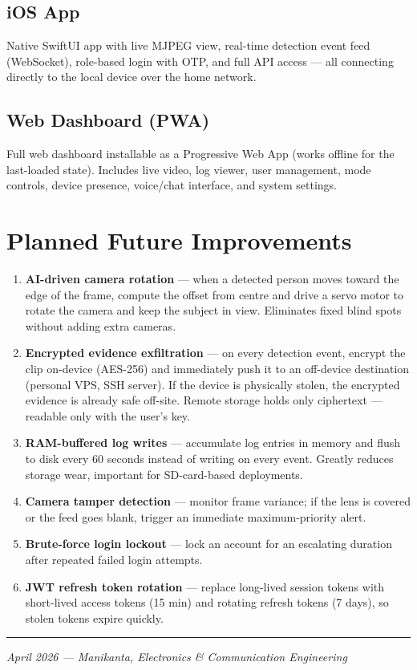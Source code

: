 \documentclass[12pt,a4paper]{article}
\begin{document}
\subsection*{iOS App}
Native SwiftUI app with live MJPEG view, real-time detection event feed
(WebSocket), role-based login with OTP, and full API access — all
connecting directly to the local device over the home network.

\subsection*{Web Dashboard (PWA)}
Full web dashboard installable as a Progressive Web App (works offline
for the last-loaded state). Includes live video, log viewer, user
management, mode controls, device presence, voice/chat interface, and
system settings.

\section*{Planned Future Improvements}

\begin{enumerate}[leftmargin=2em, itemsep=4pt]
  \item \textbf{AI-driven camera rotation} — when a detected person moves
        toward the edge of the frame, compute the offset from centre and
        drive a servo motor to rotate the camera and keep the subject in view.
        Eliminates fixed blind spots without adding extra cameras.

  \item \textbf{Encrypted evidence exfiltration} — on every detection event,
        encrypt the clip on-device (AES-256) and immediately push it to an
        off-device destination (personal VPS, SSH server). If the device
        is physically stolen, the encrypted evidence is already safe
        off-site. Remote storage holds only ciphertext — readable only with
        the user's key.

  \item \textbf{RAM-buffered log writes} — accumulate log entries in memory
        and flush to disk every 60 seconds instead of writing on every event.
        Greatly reduces storage wear, important for SD-card-based deployments.

  \item \textbf{Camera tamper detection} — monitor frame variance; if the
        lens is covered or the feed goes blank, trigger an immediate
        maximum-priority alert.

  \item \textbf{Brute-force login lockout} — lock an account for an
        escalating duration after repeated failed login attempts.

  \item \textbf{JWT refresh token rotation} — replace long-lived session
        tokens with short-lived access tokens (15 min) and rotating refresh
        tokens (7 days), so stolen tokens expire quickly.
\end{enumerate}

\vspace{1em}
\noindent\rule{\textwidth}{0.4pt}
\noindent\small\textit{April 2026 — Manikanta, Electronics \& Communication Engineering}
\end{document}
